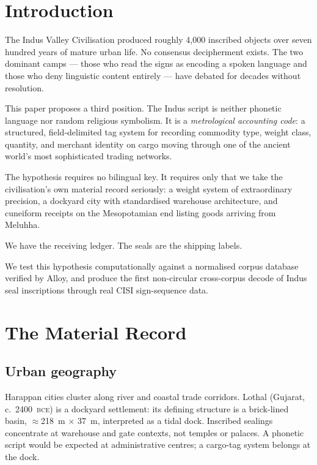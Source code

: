 \section{Introduction}

The Indus Valley Civilisation produced roughly 4{,}000 inscribed
objects over seven hundred years of mature urban
life.\smartcite{Mahadevan1977}
No consensus decipherment exists.
The two dominant camps --- those who read the signs as encoding a
spoken language and those who deny linguistic content entirely ---
have debated for decades without
resolution.\smartcite{FSW2004}

This paper proposes a third position.
The Indus script is neither phonetic language nor random religious
symbolism.
It is a \emph{metrological accounting code}: a structured,
field-delimited tag system for recording commodity type, weight
class, quantity, and merchant identity on cargo moving through one
of the ancient world's most sophisticated trading networks.

The hypothesis requires no bilingual key.
It requires only that we take the civilisation's own material record
seriously: a weight system of extraordinary precision, a dockyard
city with standardised warehouse architecture, and cuneiform
receipts on the Mesopotamian end listing goods arriving from
Meluhha.\smartcite{Ratnagar2004}

We have the receiving ledger. The seals are the shipping labels.

We test this hypothesis computationally against a normalised corpus
database verified by Alloy, and produce the first non-circular
cross-corpus decode of Indus seal inscriptions through real CISI
sign-sequence data.

\section{The Material Record}

\subsection{Urban geography}

Harappan cities cluster along river and coastal trade corridors.
Lothal (Gujarat, c.\ 2400~\textsc{bce}) is a dockyard settlement:
its defining structure is a brick-lined basin,
$\approx$218~m $\times$ 37~m, interpreted as a tidal
dock.\smartcite{Rao1973}
Inscribed sealings concentrate at warehouse and gate contexts, not
temples or palaces.
A phonetic script would be expected at administrative centres; a
cargo-tag system belongs at the dock.


